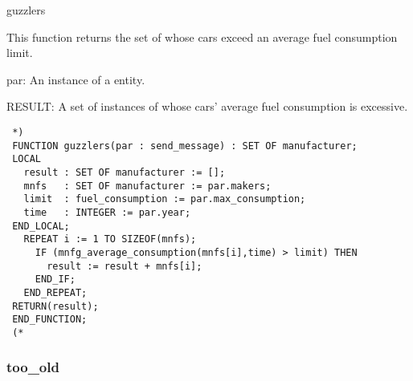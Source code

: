 \documentclass{article}
\begin{document}
 \begin{Mnamedesc}{guzzlers}

 \begin{Mdesctext}

 This function returns the set of  whose cars exceed an
 average fuel consumption limit.

 \end{Mdesctext}

 \begin{Ipars}

 \item[par:] An instance of a  entity.

 \item[RESULT:] A set of instances of  whose cars' average
 fuel consumption is excessive.

 \end{Ipars}

 \begin{Mexp}
 \begin{verbatim}
 *)
 FUNCTION guzzlers(par : send_message) : SET OF manufacturer;
 LOCAL
   result : SET OF manufacturer := [];
   mnfs   : SET OF manufacturer := par.makers;
   limit  : fuel_consumption := par.max_consumption;
   time   : INTEGER := par.year;
 END_LOCAL;
   REPEAT i := 1 TO SIZEOF(mnfs);
     IF (mnfg_average_consumption(mnfs[i],time) > limit) THEN
       result := result + mnfs[i];
     END_IF;
   END_REPEAT;
 RETURN(result);
 END_FUNCTION;
 (*
 \end{verbatim}
 \end{Mexp}
 \end{Mnamedesc}

 \subsubsection{too\_old}
\end{document}
